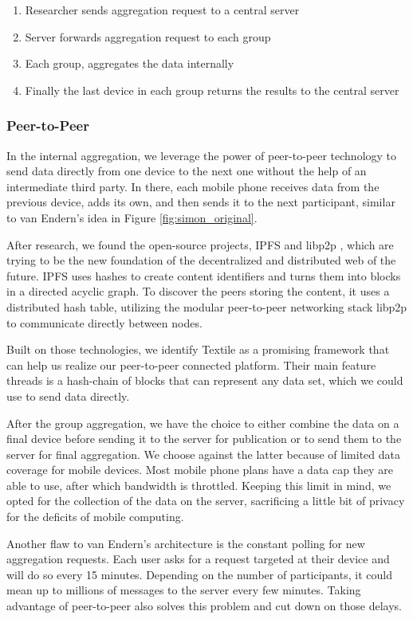\begin{enumerate}
    \item Researcher sends aggregation request to a central server
    \item Server forwards aggregation request to each group
    \item Each group, aggregates the data internally
    \item Finally the last device in each group returns the results to the central server
\end{enumerate}

\subsubsection{Peer-to-Peer}
In the internal aggregation, we leverage the power of peer-to-peer technology to send data directly from one device to the next one without the help of an intermediate third party. In there, each mobile phone receives data from the previous device, adds its own, and then sends it to the next participant, similar to van Endern's idea in Figure \ref{fig:simon_original}.

After research, we found the open-source projects, IPFS \cite{DBLP:journals/corr/Benet14} and libp2p \cite{libp2p}, which are trying to be the new foundation of the decentralized and distributed web of the future. IPFS uses hashes to create content identifiers and turns them into blocks in a directed acyclic graph. To discover the peers storing the content, it uses a distributed hash table, utilizing the modular peer-to-peer networking stack libp2p to communicate directly between nodes.

Built on those technologies, we identify Textile as a promising framework that can help us realize our peer-to-peer connected platform. Their main feature threads is a hash-chain of blocks that can represent any data set, which we could use to send data directly.

After the group aggregation, we have the choice to either combine the data on a final device before sending it to the server for publication or to send them to the server for final aggregation. We choose against the latter because of limited data coverage for mobile devices. Most mobile phone plans have a data cap they are able to use, after which bandwidth is throttled. Keeping this limit in mind, we opted for the collection of the data on the server, sacrificing a little bit of privacy for the deficits of mobile computing.

Another flaw to van Endern's architecture is the constant polling for new aggregation requests. Each user asks for a request targeted at their device and will do so every 15 minutes. Depending on the number of participants, it could mean up to millions of messages to the server every few minutes. Taking advantage of peer-to-peer also solves this problem and cut down on those delays. 

